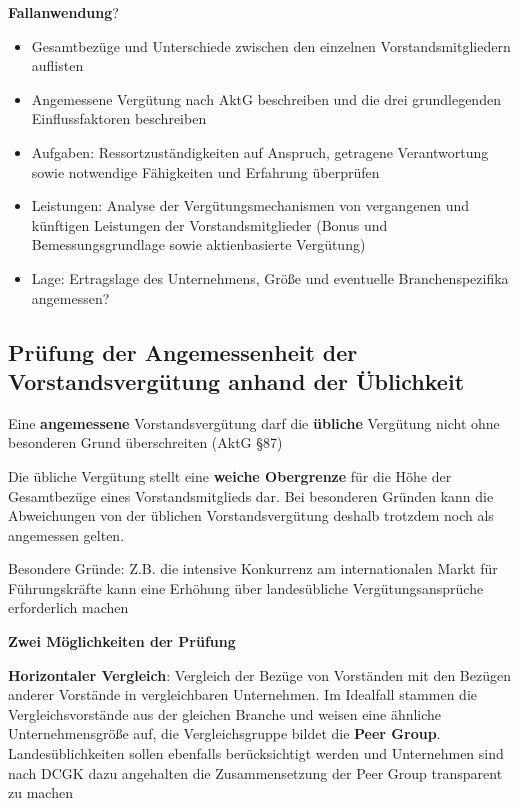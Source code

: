 \documentclass[
]{article}
\providecommand{\tightlist}{%
  \setlength{\itemsep}{0pt}\setlength{\parskip}{0pt}}
\begin{document}
\textbf{Fallanwendung}?

\begin{itemize}
\tightlist
\item
  Gesamtbezüge und Unterschiede zwischen den einzelnen
  Vorstandsmitgliedern auflisten
\item
  Angemessene Vergütung nach AktG beschreiben und die drei grundlegenden
  Einflussfaktoren beschreiben
\item
  Aufgaben: Ressortzuständigkeiten auf Anspruch, getragene Verantwortung
  sowie notwendige Fähigkeiten und Erfahrung überprüfen
\item
  Leistungen: Analyse der Vergütungsmechanismen von vergangenen und
  künftigen Leistungen der Vorstandsmitglieder (Bonus und
  Bemessungsgrundlage sowie aktienbasierte Vergütung)
\item
  Lage: Ertragslage des Unternehmens, Größe und eventuelle
  Branchenspezifika angemessen?
\end{itemize}

\hypertarget{pruxfcfung-der-angemessenheit-der-vorstandsverguxfctung-anhand-der-uxfcblichkeit}{%
\subsection{Prüfung der Angemessenheit der Vorstandsvergütung anhand der
Üblichkeit}\label{pruxfcfung-der-angemessenheit-der-vorstandsverguxfctung-anhand-der-uxfcblichkeit}}

Eine \textbf{angemessene} Vorstandsvergütung darf die \textbf{übliche}
Vergütung nicht ohne besonderen Grund überschreiten (AktG §87)

Die übliche Vergütung stellt eine \textbf{weiche Obergrenze} für die
Höhe der Gesamtbezüge eines Vorstandsmitglieds dar. Bei besonderen
Gründen kann die Abweichungen von der üblichen Vorstandsvergütung
deshalb trotzdem noch als angemessen gelten.

Besondere Gründe: Z.B. die intensive Konkurrenz am internationalen Markt
für Führungskräfte kann eine Erhöhung über landesübliche
Vergütungsansprüche erforderlich machen

\textbf{Zwei Möglichkeiten der Prüfung }

\textbf{Horizontaler Vergleich}: Vergleich der Bezüge von Vorständen mit
den Bezügen anderer Vorstände in vergleichbaren Unternehmen. Im
Idealfall stammen die Vergleichsvorstände aus der gleichen Branche und
weisen eine ähnliche Unternehmensgröße auf, die Vergleichsgruppe bildet
die \textbf{Peer Group}. Landesüblichkeiten sollen ebenfalls
berücksichtigt werden und Unternehmen sind nach DCGK dazu angehalten die
Zusammensetzung der Peer Group transparent zu machen
\end{document}
